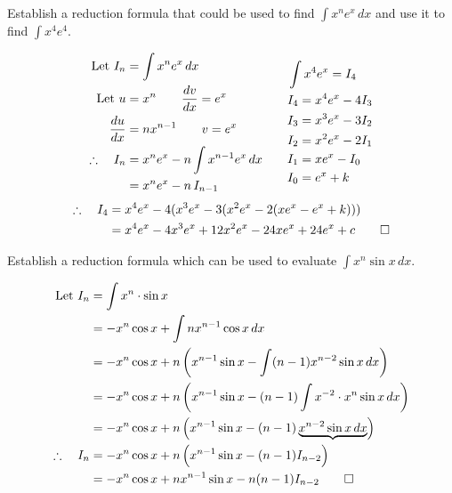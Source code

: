 \documentclass{standalone}
\begin{document}
	\begin{example}
		Establish a reduction formula that could be used to find $\int x^ne^x \, dx$ and use it to find $\int x^4e^4$.
	\end{example}
	
	\begin{equation*}
		\begin{split}
			\text{Let } I_n &= \int x^ne^x \, dx \\
			\text{Let } u 	&= x^n    \qquad   \frac{dv}{dx} = e^x \\
			\frac{du}{dx}     	&= nx^{n-1} \qquad  v = e^x         \\
			\therefore \quad I_n	&= x^ne^x - n \int x^{n-1}e^x \, dx\qquad\\
			&= x^ne^x - n\, I_{n-1}
		\end{split}
		\begin{split}
			&\int x^4e^x = I_4\\
			&I_4 = x^4e^x - 4I_3\\
			&I_3 = x^3e^x - 3I_2\\
			&I_2 = x^2e^x - 2I_1\\		
			&I_1 = xe^x - I_0\\				 		 	
			&I_0 = e^x + k
		\end{split}
	\end{equation*}
	\begin{align*}
		\therefore \quad I_4 & = x^4e^x -4(x^3e^x - 3(x^2e^x - 2(xe^x - e^x + k))) \\
		& = x^4e^x -4x^3e^x + 12x^2e^x - 24xe^x + 24e^x + c   \qed
	\end{align*}
		\hrulefill
	\begin{example}
		Establish a reduction formula which can be used to evaluate $\int x^n \sin x \, dx$.
	\end{example}
	
	\begin{align*}
		\text{Let } I_n &= \int x^n \cdot \sin x\\
						&= -x^n\cos x + \int nx^{n-1}\cos x\,dx\\
						&= -x^n\cos x + n\left(x^{n-1}\sin x - \int (n-1)x^{n-2}\sin x\,dx\right)\\
						&= -x^n\cos x + n\left(x^{n-1}\sin x - (n-1) \int x^{-2} \cdot x^n\sin x\,dx\right)\\
						&= -x^n\cos x + n\left(x^{n-1}\sin x - (n-1) \underbrace{x^{n-2}\sin x\,dx}\right)\\
						\therefore \quad I_n &= -x^n\cos x + n\left(x^{n-1}\sin x - (n-1)I_{n-2}\right)\\
						&= -x^n\cos x + nx^{n-1}\sin x - n(n-1)I_{n-2} \qed
	\end{align*}
	\hrulefill\newpage
	
\end{document}
